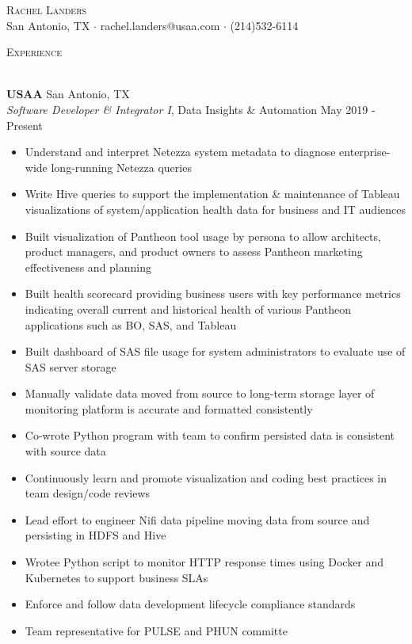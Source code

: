 \documentclass[a4paper]{article}
\newcommand{\lineunder} {
    \vspace*{-8pt} \\
    \hspace*{-18pt} \hrulefill \\
}
\newcommand{\header} [1] {
    {\hspace*{-18pt}\vspace*{6pt} \textsc{#1}}
    \vspace*{-6pt} \lineunder
}
\begin{document}
\vspace*{-10pt}

    

\vspace*{-40pt}
\begin{center}
	{\Huge \scshape {Rachel Landers}}\\
	San Antonio, TX $\cdot$ rachel.landers@usaa.com $\cdot$ (214)532-6114\\
\end{center}

\header{Experience}
\vspace{1mm}

\textbf{USAA} \hfill San Antonio, TX\\
\textit{Software Developer \& Integrator I}, Data Insights \& Automation \hfill May 2019 - Present\\
\vspace{-1mm}
\begin{itemize} \itemsep .5pt
	\item Understand and interpret Netezza system metadata to diagnose enterprise-wide long-running Netezza queries
        \item Write Hive queries to support the implementation \& maintenance of Tableau visualizations of system/application health data for business and IT audiences
	\item Built visualization of Pantheon tool usage by persona to allow architects, product managers, and product owners to assess Pantheon marketing effectiveness and planning
	\item Built health scorecard providing business users with key performance metrics indicating overall current and historical health of various Pantheon applications such as BO, SAS, and Tableau
	\item Built dashboard of SAS file usage for system administrators to evaluate use of SAS server storage
        \item Manually validate data moved from source to long-term storage layer of monitoring platform is accurate and formatted consistently
        \item Co-wrote Python program with team to confirm persisted data is consistent with source data
        \item Continuously learn and promote visualization and coding best practices in team design/code reviews
        \item Lead effort to engineer Nifi data pipeline moving data from source and persisting in HDFS and Hive
        \item Wrotee Python script to monitor HTTP response times using Docker and Kubernetes to support business SLAs
        \item Enforce and follow data development lifecycle compliance standards
	\item Team representative for PULSE and PHUN committe
\end{itemize}
\end{document}
